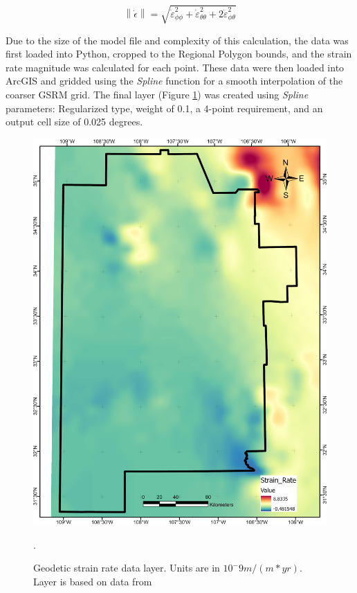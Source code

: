 \begin{equation}\label{eq:strainratemagnitude}
\left\lVert\dot{\epsilon}\right\rVert = \sqrt{\dot{\varepsilon}_{\phi\phi}^2+\dot{\varepsilon}_{\theta\theta}^2+2\dot{\varepsilon}_{\phi\theta}^2}
\end{equation}

Due to the size of the model file and complexity of this calculation, the data was first loaded into Python, cropped to the Regional Polygon bounds, and the strain rate magnitude was calculated for each point. These data were then loaded into ArcGIS and gridded using the \textit{Spline} function for a smooth interpolation of the coarser GSRM grid. The final layer (Figure \ref{fig:feat_strain}) was created using \textit{Spline} parameters: Regularized type, weight of 0.1, a 4-point requirement, and an output cell size of 0.025 degrees.

\begin{figure}[!htp]
\centering
\includegraphics[scale=.50]{templates/images/Figure-StrainRate.png}
\caption[Geodetic strain rate data layer]{Geodetic strain rate data layer. Units are in \(10^-9 m/(m*yr)\). Layer is based on data from \protect\citep{kreemer_geodetic_2014}}.
\label{fig:feat_strain}
\end{figure}

